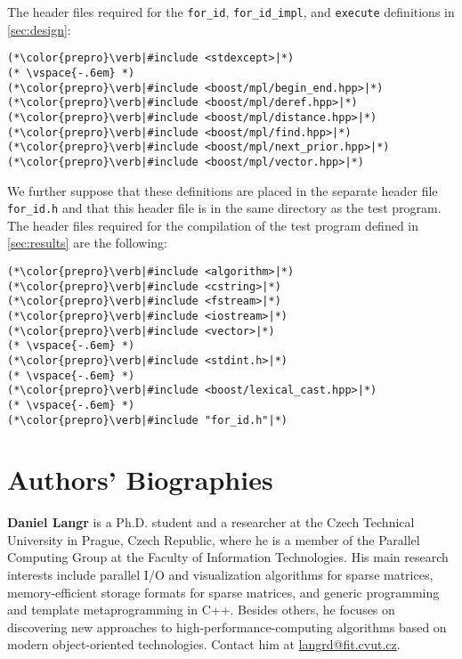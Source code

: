 \documentclass[10pt,a4paper]{article}
\theoremstyle{definition}\newtheorem{problem}{Problem}
\begin{document}
The header files required for the \texttt{for\_id}, \texttt{for\_id\_impl}, and \texttt{execute} definitions in \autoref{sec:design}:
\begin{lstlisting}
(*\color{prepro}\verb|#include <stdexcept>|*)
(* \vspace{-.6em} *)
(*\color{prepro}\verb|#include <boost/mpl/begin_end.hpp>|*)
(*\color{prepro}\verb|#include <boost/mpl/deref.hpp>|*)
(*\color{prepro}\verb|#include <boost/mpl/distance.hpp>|*)
(*\color{prepro}\verb|#include <boost/mpl/find.hpp>|*)
(*\color{prepro}\verb|#include <boost/mpl/next_prior.hpp>|*)
(*\color{prepro}\verb|#include <boost/mpl/vector.hpp>|*)
\end{lstlisting}
We further suppose that these definitions are placed in the separate header file \texttt{for\_id.h} and that this header file is in the same directory as the test program. The header files required for the compilation of the test program defined in \autoref{sec:results} are the following:
\begin{lstlisting}
(*\color{prepro}\verb|#include <algorithm>|*)
(*\color{prepro}\verb|#include <cstring>|*)
(*\color{prepro}\verb|#include <fstream>|*)
(*\color{prepro}\verb|#include <iostream>|*)
(*\color{prepro}\verb|#include <vector>|*)
(* \vspace{-.6em} *)
(*\color{prepro}\verb|#include <stdint.h>|*)
(* \vspace{-.6em} *)
(*\color{prepro}\verb|#include <boost/lexical_cast.hpp>|*)
(* \vspace{-.6em} *)
(*\color{prepro}\verb|#include "for_id.h"|*)
\end{lstlisting}




\clearpage

\section*{Authors' Biographies}

\noindent\textbf{Daniel Langr}
is a Ph.D. student and a researcher at the Czech Technical University in Prague, Czech Republic, where he is a member of the Parallel Computing Group at the Faculty of Information Technologies.
His main research interests include parallel I/O and visualization algorithms for sparse matrices, memory-efficient storage formats for sparse matrices, and generic programming and template metaprogramming in C++. Besides others, he focuses on discovering new approaches to high-performance-computing algorithms based on modern object-oriented technologies.
Contact him at \href{mailto:langrd@fit.cvut.cz}{langrd@fit.cvut.cz}.
\end{document}
